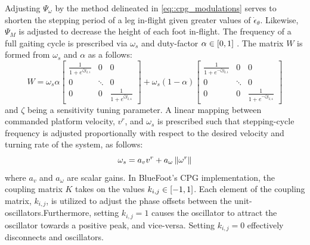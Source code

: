 			Adjusting $\Psi_{\omega}$ by the method delineated in \ref{eq::cpg_modulations} serves to shorten the stepping period of a leg in-flight given greater values of $\dot{\epsilon}_{\theta}$. Likewise, $\Psi_{M}$ is adjusted to decrease the height of each foot in-flight. The frequency of a full gaiting cycle is prescribed via $\omega_{s}$ and duty-factor $\alpha \in \left[0,1\right]$ \cite{Matos2010}. The matrix $W$ is formed from  $\omega_{s}$ and $\alpha$ as a follows:
				\newcommand{\Wel}[1]{\frac{1}{1+e^{#1}}}
				\begin{equation}
						W = 
						\omega_{s}\alpha 
						\left[	
							\begin{array}{ccc}
								\Wel{\zeta y_{2,1}} 		& 0 			& 0  \\
								0 							& \ddots 		& 0  \\
								0							& 0		 		& \Wel{\zeta y_{2,4}}
							\end{array}
						\right] + 
						\omega_{s}(1-\alpha) 
						\left[	
							\begin{array}{cccc}
								\Wel{-\zeta y_{2,1}} 		& 0 			& 0  \\
								0 							& \ddots 		& 0  \\
								0							& 0		 		& \Wel{-\zeta y_{2,4}}
							\end{array}
						\right]
					\label{eq::cpg_W_matrix_def}
				\end{equation}
			and $\zeta$ being a sensitivity tuning parameter. A linear mapping between commanded platform velocity, $v^{r}$, and $\omega_{s}$ is prescribed such that stepping-cycle frequency is adjusted proportionally with respect to the desired velocity and turning rate of the system, as follows:
				\begin{equation}
					\omega_{s} = a_{v}v^{r} + a_{\omega}\left\lVert\omega^{r}\right\rVert
				\end{equation}
			where $a_{v}$ and $a_{\omega}$ are scalar gains. In BlueFoot's CPG implementation, the coupling matrix $K$ takes on the values $k_{i,j} \in \left[-1,1\right]$. Each element of the coupling matrix, $k_{i,j}$, is utilized to adjust the phase offsets between the unit-oscillators.Furthermore, setting $k_{i,j}=1$ causes the \Jth oscillator to attract the \Ith oscillator  towards a  positive peak, and vice-versa. Setting $k_{i,j}=0$ effectively disconnects \Ith and \Jth oscillators. 

